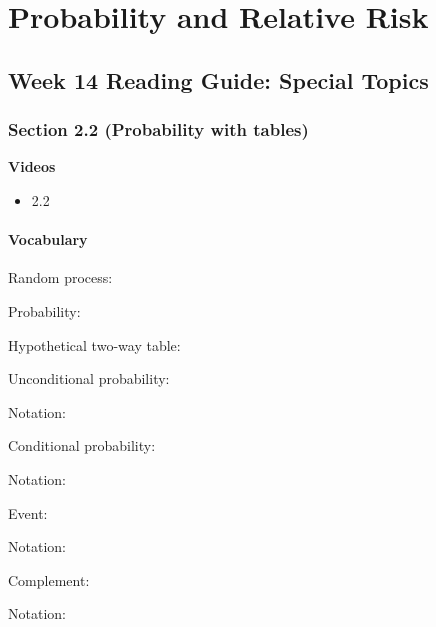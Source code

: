 \documentclass[
]{report}
\providecommand{\tightlist}{%
  \setlength{\itemsep}{0pt}\setlength{\parskip}{0pt}}
\newcommand{\rgs}{\vspace{12pt}} %
\newcommand{\rgi}{\hspace{24pt}}  %
\begin{document}
\vspace{3in}

\newpage

\hypertarget{probability-and-relative-risk}{%
\chapter{Probability and Relative Risk}\label{probability-and-relative-risk}}

\hypertarget{week-14-reading-guide-special-topics}{%
\section{Week 14 Reading Guide: Special Topics}\label{week-14-reading-guide-special-topics}}

\hypertarget{section-2.2-probability-with-tables}{%
\subsection*{Section 2.2 (Probability with tables)}\label{section-2.2-probability-with-tables}}


\textbf{Videos}

\begin{itemize}
\tightlist
\item
  2.2
\end{itemize}


\hypertarget{vocabulary-18}{%
\subsubsection*{Vocabulary}\label{vocabulary-18}}

Random process:
\rgs

Probability:
\rgs

Hypothetical two-way table:
\rgs

Unconditional probability:
\rgs

\rgi Notation:
\rgs

Conditional probability:
\rgs

\rgi Notation:
\rgs

Event:
\rgs

\rgi Notation:
\rgs

Complement:
\rgs

\rgi Notation:
\rgs
\end{document}
